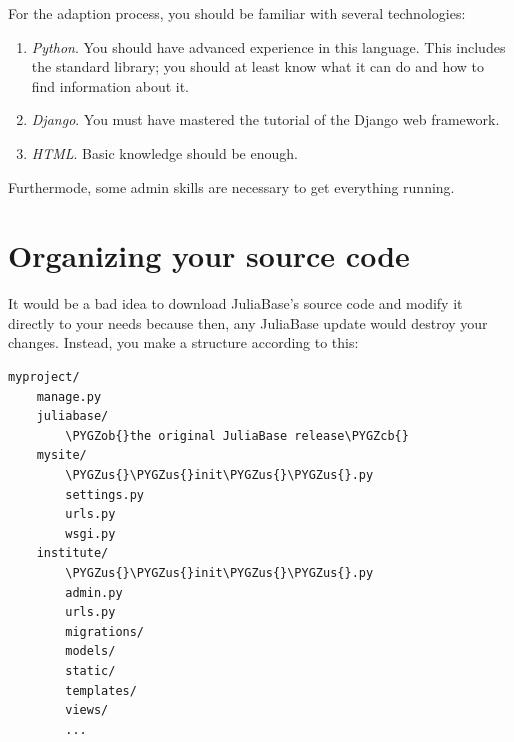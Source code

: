 \documentclass[a4paper,11pt,english]{sphinxmanual}
\def\PYGZus{\char`\_}
\def\PYGZob{\char`\{}
\def\PYGZcb{\char`\}}
\begin{document}
For the adaption process, you should be familiar with several technologies:
\begin{enumerate}
\item {} 
\emph{Python}.  You should have advanced experience in this language.  This
includes the standard library; you should at least know what it can do and
how to find information about it.

\item {} 
\emph{Django}.  You must have mastered the tutorial of the Django web framework.

\item {} 
\emph{HTML}.  Basic knowledge should be enough.

\end{enumerate}

Furthermode, some admin skills are necessary to get everything running.


\section{Organizing your source code}
\label{programming/programming:organizing-your-source-code}\label{programming/programming:index-1}\label{programming/programming:id1}
It would be a bad idea to download JuliaBase's source code and modify it
directly to your needs because then, any JuliaBase update would destroy your
changes.  Instead, you make a structure according to this:

\begin{Verbatim}[commandchars=\\\{\},formatcom=\scriptsize]
myproject/
    manage.py
    juliabase/
        \PYGZob{}the original JuliaBase release\PYGZcb{}
    mysite/
        \PYGZus{}\PYGZus{}init\PYGZus{}\PYGZus{}.py
        settings.py
        urls.py
        wsgi.py
    institute/
        \PYGZus{}\PYGZus{}init\PYGZus{}\PYGZus{}.py
        admin.py
        urls.py
        migrations/
        models/
        static/
        templates/
        views/
        ...
\end{Verbatim}
\end{document}
